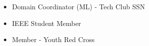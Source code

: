 %
%
%

\twocolumnsection
{
\begin{skills}
\end{skills}}
{
\vspace{1em}
\begin{itemize}
	\item Domain Coordinator (ML) - Tech Club SSN
	\item IEEE Student Member
	\item Member - Youth Red Cross
\end{itemize}
}
